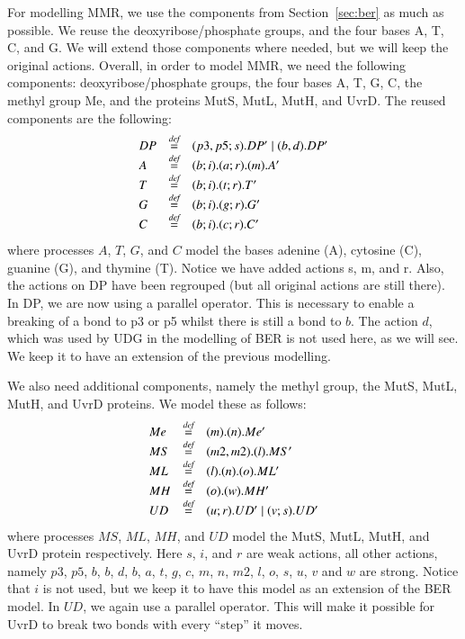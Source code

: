 \documentclass[review]{elsarticle}
\newcommand{\paral}{\; \vert \;}
\newcommand{\bydef}{\stackrel{\emph{def}}{=}}
\begin{document}
For modelling MMR, we use the components from Section~\ref{sec:ber} as much as possible. We reuse the deoxyribose/phosphate groups, and the four bases A, T, C, and G. We will extend those components where needed, but we will keep the original actions. Overall, in order to model MMR, we need the following components: deoxyribose/phosphate groups, the four bases A, T, G, C, the methyl group Me, and the proteins MutS, MutL, MutH, and UvrD. The reused components are the following:
%
$$\begin{array}{lll}
DP & \bydef & (p3,p5;s).DP' \paral (b,d).DP'\\
A & \bydef & (b;i).(a;r).(m).A'\\
T & \bydef & (b;i).(t;r).T'\\
G & \bydef & (b;i).(g;r).G'\\
C & \bydef & (b;i).(c;r).C'\\
\end{array}$$
%
where processes $A$, $T$, $G$, and $C$ model the bases adenine (A), cytosine (C), guanine (G), and thymine (T). Notice we have added actions s, m, and r. Also, the actions on DP have been regrouped (but all original actions are still there). In DP, we are now using a parallel operator. This is necessary to enable a breaking of a bond to p3 or p5 whilst there is still a bond to $b$. The action $d$, which was used by UDG in the modelling of BER is not used here, as we will see. We keep it to have an extension of the previous modelling.

We also need additional components, namely the methyl group, the MutS, MutL, MutH, and UvrD proteins. We model these as follows:
$$\begin{array}{lll}
Me & \bydef & (m).(n).Me'\\
MS & \bydef & (m2,m2).(l).MS'\\
ML & \bydef & (l).(n).(o).ML'\\
MH & \bydef & (o).(w).MH'\\
UD & \bydef & (u;r).UD' \paral (v;s).UD'\\
\end{array}$$
%
where processes $MS$, $ML$, $MH$, and $UD$ model the MutS, MutL, MutH, and UvrD protein respectively.  Here $s$, $i$, and $r$ are weak actions, all other actions, namely $p3$, $p5$, $b$, $b$, $d$, $b$, $a$, $t$, $g$, $c$, $m$, $n$, $m2$, $l$, $o$, $s$, $u$, $v$ and $w$ are strong. Notice that $i$ is not used, but we keep it to have this model as an extension of the BER model. In $UD$, we again use a  parallel operator. This will make it possible for UvrD to break two bonds with every ``step'' it moves.
\end{document}
